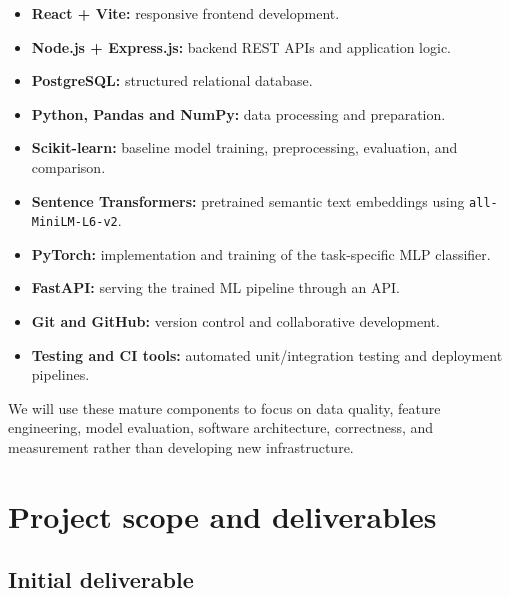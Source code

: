 \documentclass[11pt,a4paper]{article}
\newcommand{\BvrHint}[1]{%
  {\normalfont\normalsize\itshape\hfill #1}}
\begin{document}
\begin{itemize}[leftmargin=0.7cm]

    \item \textbf{React + Vite:} responsive frontend development.

    \item \textbf{Node.js + Express.js:} backend REST APIs and application
    logic.

    \item \textbf{PostgreSQL:} structured relational database.

    \item \textbf{Python, Pandas and NumPy:} data processing and preparation.

    \item \textbf{Scikit-learn:} baseline model training, preprocessing,
    evaluation, and comparison.

    \item \textbf{Sentence Transformers:} pretrained semantic text
    embeddings using \texttt{all-MiniLM-L6-v2}.

    \item \textbf{PyTorch:} implementation and training of the task-specific
    MLP classifier.

    \item \textbf{FastAPI:} serving the trained ML pipeline through an API.

    \item \textbf{Git and GitHub:} version control and collaborative
    development.

    \item \textbf{Testing and CI tools:} automated unit/integration testing
    and deployment pipelines.
\end{itemize}

We will use these mature components to focus on data quality, feature
engineering, model evaluation, software architecture, correctness, and
measurement rather than developing new infrastructure.

\section{Project scope and deliverables%
\BvrHint{}}

\subsection{Initial deliverable%
\BvrHint{}}
\end{document}
